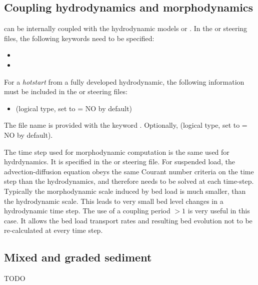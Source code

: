 \subsection{Coupling hydrodynamics and morphodynamics}
\gaia{} can be internally coupled with the hydrodynamic models  or . In the  or  steering files, the following keywords need to be specified:
\begin{itemize}
\item {}
\item {}
\end{itemize}
For a \textit{hotstart} from a fully developed hydrodynamic, the following information must be included in the  or  steering files:
\begin{itemize}
\item {} (logical type, set to {\ttfamily = NO} by default)
\end{itemize}
The file name is provided with the keyword . Optionally,  (logical type, set to {\ttfamily = NO} by default).

The time step used for morphodynamic computation is the same used for hydrdynamics. It is specified in the  or  steering file. For suspended load, the advection-diffusion equation obeys the same Courant number criteria on the time step than the hydrodynamics, and therefore needs to be solved at each time-step. Typically the morphodynamic scale induced by bed load is much smaller, than the hydrodynamic scale. This leads to very small bed level changes in a hydrodynamic time step. The use of a coupling period $>1$ is  very useful in this case. It allows the bed load transport rates and resulting bed evolution not to be re-calculated at every time step.

\subsection{Mixed and graded sediment}
TODO

